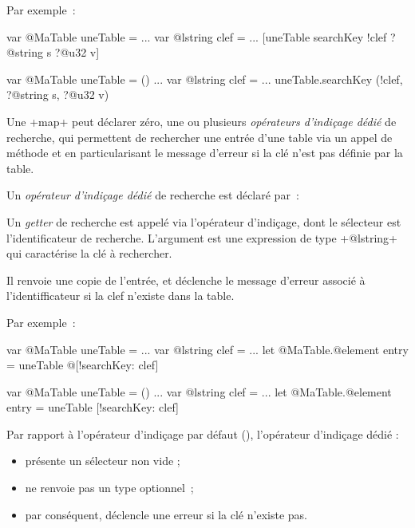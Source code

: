 Par exemple~:

\begin{galgas4}
var @MaTable uneTable = {}
...
var @lstring clef = ...
[uneTable searchKey !clef ?@string s ?@u32 v]
\end{galgas4}


\begin{galgas4}
var @MaTable uneTable = ()
...
var @lstring clef = ...
uneTable.searchKey (!clef, ?@string s, ?@u32 v)
\end{galgas4}






Une \ggsq+map+ peut déclarer zéro, une ou plusieurs \emph{opérateurs d'indiçage dédié} de recherche, qui permettent de rechercher une entrée d'une table via un appel de méthode et en particularisant le message d'erreur si la clé n'est pas définie par la table.


Un \emph{opérateur d'indiçage dédié} de recherche est déclaré par~:


\begin{galgas4}
\end{galgas4}

\begin{galgas4}
\end{galgas4}



Un \emph{getter} de recherche est appelé via l'opérateur d'indiçage, dont le sélecteur est l'identificateur de recherche. L'argument est une expression de type \ggsq+@lstring+ qui caractérise la clé à rechercher.

Il renvoie une copie de l'entrée, et déclenche le message d'erreur associé à l'identifficateur si la clef n'existe dans la table.


Par exemple~:
\begin{galgas4}
var @MaTable uneTable = {}
...
var @lstring clef = ...
let @MaTable.@element entry = uneTable @[!searchKey: clef]
\end{galgas4}

\begin{galgas4}
var @MaTable uneTable = ()
...
var @lstring clef = ...
let @MaTable.@element entry = uneTable [!searchKey: clef]
\end{galgas4}

Par rapport à l'opérateur d'indiçage par défaut (), l'opérateur d'indiçage dédié :
\begin{itemize}
  \item présente un sélecteur non vide ;
  \item ne renvoie pas un type optionnel~;
  \item par conséquent, déclencle une erreur si la clé n'existe pas.
\end{itemize}




